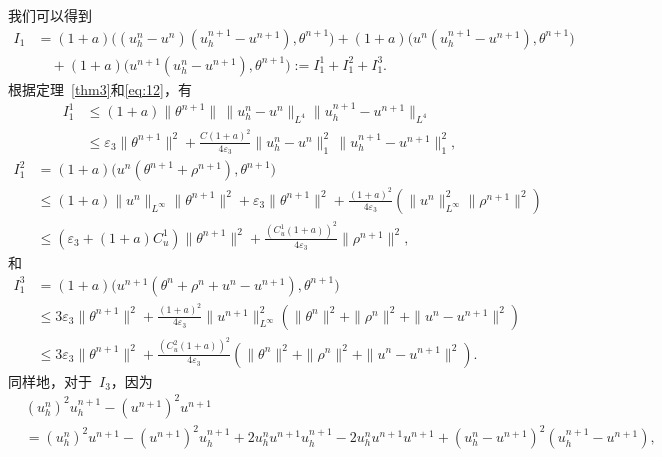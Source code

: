 \documentclass[twoside,UTF8]{nputhesis}
\begin{document}
我们可以得到
\begin{equation*}
\begin{split}
I_1&=(1+a)\Big(\!(u^n_h-u^n\!)\!(u^{n+1}_h-u^{n+1}\!),\theta^{n+1}\Big)+(1+a)\Big(u^n(u^{n+1}_h-u^{n+1}),\theta^{n+1}\Big)\\
&\quad +(1+a)\Big(u^{n+1}(u^n_h-u^{n+1}),\theta^{n+1}\Big):=I_1^1+I_1^2+I_1^3.
\end{split}
\end{equation*}
根据定理~\ref{thm3}和\eqref{eq:12}，有
\begin{equation}
\begin{split}
I_1^1&\leq(1+a)\| \theta^{n+1}\|\,\| u^n_h\!-\!u^n\|_{L^4}\| u^{n+1}_h\!-\!u^{n+1}\|_{L^4}\\
&\leq\varepsilon_3\| \theta^{n+1}\|^2+\frac{C(1+a)^2}{4\varepsilon_3}\| u^n_h-u^n\|^2_1\,\| u^{n+1}_h-u^{n+1}\|^2_1,
\label{71}
\end{split}
\end{equation}
\begin{equation}
\begin{split}
I_1^2&=(1+a)\Big(u^n(\theta^{n+1}+\rho^{n+1}),\theta^{n+1}\Big)\\
&\leq(1+a)\| u^n\|_{L^\infty}\| \theta^{n+1}\|^2+\varepsilon_3\| \theta^{n+1}\|^2+\frac{(1+a)^2}{4\varepsilon_3}(\| u^n\|^2_{L^\infty}\| \rho^{n+1}\|^2)\\
&\leq(\varepsilon_3+(1+a)C_u^1)\| \theta^{n+1}\|^2+\frac{(C_u^1(1+a))^2}{4\varepsilon_3}\| \rho^{n+1}\|^2,
\label{72}
\end{split}
\end{equation}
和
\begin{equation}
\begin{split}
I_1^3&=(1+a)\Big(u^{n+1}(\theta^n+\rho^n+u^n-u^{n+1}),\theta^{n+1}\Big)\\
&\leq3\varepsilon_3\| \theta^{n+1}\|^2+\frac{(1+a)^2}{4\varepsilon_3}\| u^{n+1}\|^2_{L^\infty}(\| \theta^n\|^2+\| \rho^n\|^2+\| u^n-u^{n+1}\|^2)\\
&\leq3\varepsilon_3\| \theta^{n+1}\|^2+\frac{(C_u^2(1+a))^2}{4\varepsilon_3}(\| \theta^n\|^2+\| \rho^n\|^2+\| u^n-u^{n+1}\|^2).
\label{73}
\end{split}
\end{equation}
同样地，对于~$I_3$，因为
\begin{equation*}
\begin{split}
&(u^n_h)^2u^{n+1}_h-(u^{n+1})^2u^{n+1}\\
&\!=\!(u^n_h)^2u^{n+1}\!-\!(u^{n+1})^2u^{n+1}_h\!+\!2u^n_hu^{n+1}u^{n+1}_h\!-\!2u^n_hu^{n+1}u^{n+1}\!+\!(u^n_h\!-\!u^{n+1})^2(u^{n+1}_h\!-\!u^{n+1}),
\end{split}
\end{equation*}
\end{document}
